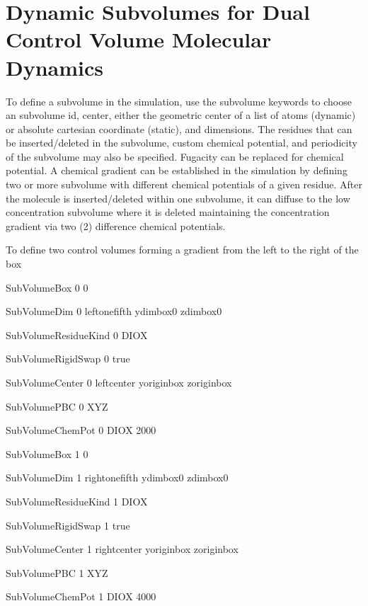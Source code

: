 \documentclass[letterpaper,10pt,english]{sphinxmanual}
\begin{document}
\section{Dynamic Subvolumes for Dual Control Volume Molecular Dynamics}
\label{\detokenize{hybrid_MC_MD:dynamic-subvolumes-for-dual-control-volume-molecular-dynamics}}
\sphinxAtStartPar
To define a subvolume in the simulation, use the subvolume keywords to choose an subvolume id, center, either the geometric center of a list of atoms (dynamic) or absolute cartesian coordinate (static), and dimensions.  The residues that can be inserted/deleted in the subvolume, custom chemical potential, and periodicity of the subvolume may also be specified.  Fugacity can be replaced for chemical potential.  A chemical gradient can be established in the simulation by defining two or more subvolume with different chemical potentials of a given residue.  After the molecule is inserted/deleted within one subvolume, it can diffuse to the low concentration subvolume where it is deleted maintaining the concentration gradient via two (2) difference chemical potentials.

\sphinxAtStartPar
To define two control volumes forming a gradient from the left to the right of the box

\begin{sphinxVerbatim}[commandchars=\\\{\}]
SubVolumeBox                0       0

SubVolumeDim                0       left\PYGZus{}one\PYGZus{}fifth y\PYGZus{}dim\PYGZus{}box\PYGZus{}0 z\PYGZus{}dim\PYGZus{}box\PYGZus{}0

SubVolumeResidueKind        0       DIOX

SubVolumeRigidSwap          0       true

SubVolumeCenter             0       left\PYGZus{}center y\PYGZus{}origin\PYGZus{}box z\PYGZus{}origin\PYGZus{}box

SubVolumePBC                0       XYZ

SubVolumeChemPot            0       DIOX    \PYGZhy{}2000


SubVolumeBox                1       0

SubVolumeDim                1       right\PYGZus{}one\PYGZus{}fifth  y\PYGZus{}dim\PYGZus{}box\PYGZus{}0 z\PYGZus{}dim\PYGZus{}box\PYGZus{}0

SubVolumeResidueKind        1       DIOX

SubVolumeRigidSwap          1       true

SubVolumeCenter             1       right\PYGZus{}center y\PYGZus{}origin\PYGZus{}box z\PYGZus{}origin\PYGZus{}box

SubVolumePBC                1       XYZ

SubVolumeChemPot            1       DIOX    \PYGZhy{}4000
\end{sphinxVerbatim}
\end{document}
